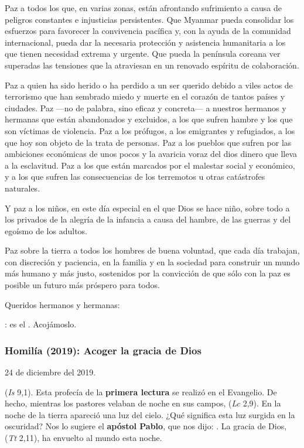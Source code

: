 \begin{body}
\begin{body}
Paz a todos los que, en varias zonas, están afrontando sufrimiento a causa de peligros constantes e injusticias persistentes. Que Myanmar pueda consolidar los esfuerzos para favorecer la convivencia pacífica y, con la ayuda de la comunidad internacional, pueda dar la necesaria protección y asistencia humanitaria a los que tienen necesidad extrema y urgente. Que pueda la península coreana ver superadas las tensiones que la atraviesan en un renovado espíritu de colaboración.

Paz a quien ha sido herido o ha perdido a un ser querido debido a viles actos de terrorismo que han sembrado miedo y muerte en el corazón de tantos países y ciudades. Paz ---no de palabra, sino eficaz y concreta--- a nuestros hermanos y hermanas que están abandonados y excluidos, a los que sufren hambre y los que son víctimas de violencia. Paz a los prófugos, a los emigrantes y refugiados, a los que hoy son objeto de la trata de personas. Paz a los pueblos que sufren por las ambiciones económicas de unos pocos y la avaricia voraz del dios dinero que lleva a la esclavitud. Paz a los que están marcados por el malestar social y económico, y a los que sufren las consecuencias de los terremotos u otras catástrofes naturales.

Y paz a los niños, en este día especial en el que Dios se hace niño, sobre todo a los privados de la alegría de la infancia a causa del hambre, de las guerras y del egoísmo de los adultos.

Paz sobre la tierra a todos los hombres de buena voluntad, que cada día trabajan, con discreción y paciencia, en la familia y en la sociedad para construir un mundo más humano y más justo, sostenidos por la convicción de que sólo con la paz es posible un futuro más próspero para todos.

Queridos hermanos y hermanas:

: es el . Acojámoslo.

\subsubsection{Homilía (2019): Acoger la gracia de Dios}

24 de diciembre del 2019.

 (\emph{Is} 9,1). Esta profecía de la \textbf{primera lectura} se realizó en el Evangelio. De hecho, mientras los pastores velaban de noche en sus campos,  (\emph{Lc} 2,9). En la noche de la tierra apareció una luz del cielo. ¿Qué significa esta luz surgida en la oscuridad? Nos lo sugiere el \textbf{apóstol Pablo}, que nos dijo: . La gracia de Dios,  (\emph{Tt} 2,11), ha envuelto al mundo esta noche.


\end{body}
\end{body}

